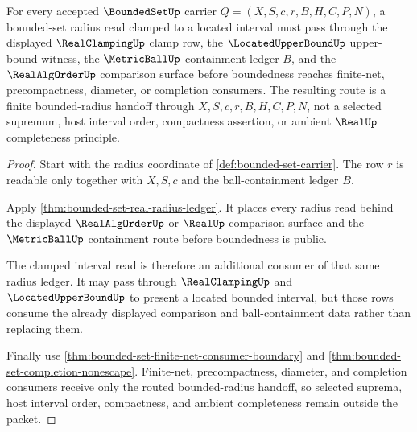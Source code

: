 \begin{theorem}
\label{thm:bounded-set-real-clamping-stability}
For every accepted $\BoundedSetUp$ carrier $Q=(X,S,c,r,B,H,C,P,N)$, a bounded-set radius read clamped to a located interval must pass through the displayed $\RealClampingUp$ clamp row, the $\LocatedUpperBoundUp$ upper-bound witness, the $\MetricBallUp$ containment ledger $B$, and the $\RealAlgOrderUp$ comparison surface before boundedness reaches finite-net, precompactness, diameter, or completion consumers. The resulting route is a finite bounded-radius handoff through $X,S,c,r,B,H,C,P,N$, not a selected supremum, host interval order, compactness assertion, or ambient $\RealUp$ completeness principle.
\end{theorem}
\begin{proof}
Start with the radius coordinate of \autoref{def:bounded-set-carrier}. The row $r$ is readable only together with $X,S,c$ and the ball-containment ledger $B$.

Apply \autoref{thm:bounded-set-real-radius-ledger}. It places every radius read behind the displayed $\RealAlgOrderUp$ or $\RealUp$ comparison surface and the $\MetricBallUp$ containment route before boundedness is public.

The clamped interval read is therefore an additional consumer of that same radius ledger. It may pass through $\RealClampingUp$ and $\LocatedUpperBoundUp$ to present a located bounded interval, but those rows consume the already displayed comparison and ball-containment data rather than replacing them.

Finally use \autoref{thm:bounded-set-finite-net-consumer-boundary} and \autoref{thm:bounded-set-completion-nonescape}. Finite-net, precompactness, diameter, and completion consumers receive only the routed bounded-radius handoff, so selected suprema, host interval order, compactness, and ambient completeness remain outside the packet.
\end{proof}

